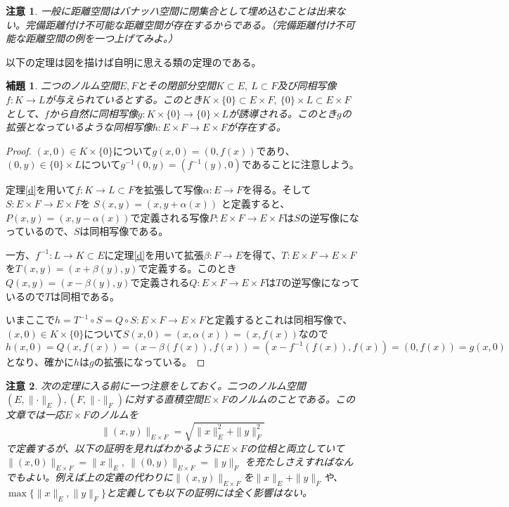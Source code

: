 \documentclass[leqno]{jsarticle}
\newtheorem{lem}[thm]{補題}
\newtheorem*{cau}{注意}
\newcommand{\al}{\alpha}
\newcommand{\be}{\beta}
\begin{document}
\begin{cau}
一般に距離空間はバナッハ空間に閉集合として埋め込むことは出来ない。完備距離付け不可能な距離空間が存在するからである。（完備距離付け不可能な距離空間の例を一つ上げてみよ。）
\end{cau}

以下の定理は図を描けば自明に思える類の定理のである。
\begin{lem}\label{lem}
二つのノルム空間$E,F$とその閉部分空間$K\subset E,\ L\subset F$及び同相写像$f:K\to L$が与えられているとする。このとき$K\times\{0\}\subset E\times F,\ \{0\}\times L\subset E\times F$として、$f$から自然に同相写像$g:K\times\{0\}\to \{0\}\times L$が誘導される。このとき$g$の拡張となっているような同相写像$h:E\times F\to E\times F$が存在する。
\end{lem}
\begin{proof}
$(x,0)\in K\times\{0\}$について$g(x,0)=(0,f(x))$であり、$(0,y)\in \{0\}\times L$について$g^{-1}(0,y)=(f^{-1}(y),0)$であることに注意しよう。\par
定理\ref{d}を用いて$f:K\to L\subset F$を拡張して写像$\al:E\to F$を得る。そして$S:E\times F\to E\times F$を
$S(x,y)=(x,y+\al(x))$
と定義すると、$P(x,y)=(x,y-\al(x))$で定義される写像$P:E\times F\to E\times F$は$S$の逆写像になっているので、$S$は同相写像である。\par
一方、$f^{-1}:L\to K\subset E$に定理\ref{d}を用いて拡張$\be:F\to E$を得て、$T:E\times F\to E\times F$を$T(x,y)=(x+\be(y),y)$で定義する。このとき$Q(x,y)=(x-\be(y),y)$で定義される$Q:E\times F\to E\times F$は$T$の逆写像になっているので$T$は同相である。\par
いまここで$h=T^{-1}\circ S=Q\circ S:E\times F\to E\times F$と定義するとこれは同相写像で、$(x,0)\in K\times \{0\}$について$S(x,0)=(x,\al(x))=(x,f(x))$なので
\[
h(x,0)=Q(x,f(x))=(x-\be(f(x)),f(x))=(x-f^{-1}(f(x)),f(x))=(0,f(x))=g(x,0)
\]
となり、確かに$h$は$g$の拡張になっている。
\end{proof}
\begin{cau}
次の定理に入る前に一つ注意をしておく。二つのノルム空間$(E,\lVert\cdot\rVert_E),(F,\lVert\cdot\rVert_F)$に対する直積空間$E\times F$のノルムのことである。この文章では一応$E\times F$のノルムを
\[
\|(x,y)\|_{E\times F}=\sqrt{\|x\|^2_{E}+\|y\|^2_F}
\]
で定義するが、以下の証明を見ればわかるように$E\times F$の位相と両立していて$\|(x,0)\|_{E\times F}=\|x\|_E,\ \|(0,y)\|_{E\times F}=\|y\|_F$
を充たしさえすればなんでもよい。例えば上の定義の代わりに$\|(x,y)\|_{E\times F}$を$\|x\|_E+\|y\|_F$や、$\max\{\|x\|_E,\|y\|_F\}$と定義しても以下の証明には全く影響はない。
\end{cau}
\end{document}
